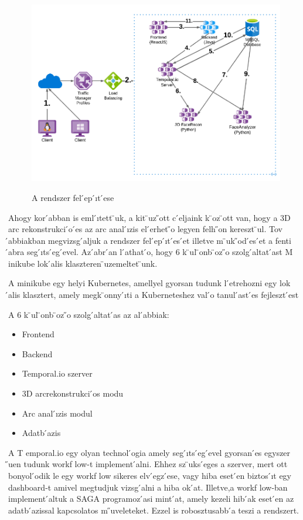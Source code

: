 \documentclass[12pt,a4]{article}
\begin{document}
	\begin{figure}[h]	
		\centering
		\includegraphics[width=1\linewidth]{sysplan}
		\label{fig:sysplan}
		\caption{ A rendszer fel ́ep ́ıt ́ese}
	\end{figure}

	Ahogy kor ́abban is eml ́ıtett ̈uk, a kit ̈uz ̋ott c ́eljaink k ̈oz ̈ott van, hogy a
	3D arc rekonstrukci ́o  ́es az arc anal ́ızis el ́erhet ̋o legyen felh ̋on kereszt ̈ul.
	Tov ́abbiakban megvizsg ́aljuk a rendszer fel ́ep ́ıt ́es ́et illetve m ̈uk ̋od ́es ́et a
	fenti  ́abra seg ́ıts ́eg ́evel. Az  ́abr ́an l ́athat ́o, hogy 6 k ̈ul ̈onb ̈oz ̋o szolg ́altat ́ast
	M inikube lok ́alis klaszteren  ̈uzemeltet ̈unk.
	
	\begin{mdframed}
		A minikube egy helyi Kubernetes, amellyel gyorsan tudunk l ́etrehozni
		egy lok ́alis klasztert, amely megk ̈onny ́ıti a Kuberneteshez val ́o tanul ́ast
		́es fejleszt ́est
	\end{mdframed}

	A 6 k ̈ul ̈onb ̈oz ̋o szolg ́altat ́as az al ́abbiak:
	\begin{itemize}
		\item Frontend
		\item Backend
		\item Temporal.io szerver
		\item 3D arcrekonstrukci ́os modu
		\item Arc anal ́ızis modul
		\item Adatb ́azis
	\end{itemize}

	A T emporal.io egy olyan technol ́ogia amely seg ́ıts ́eg ́evel gyorsan  ́es
	egyszer ̋uen tudunk workf low-t implement ́alni. Ehhez sz ̈uks ́eges a szerver,
	mert ott bonyol ́odik le egy workf low sikeres elv ́egz ́ese, vagy hiba eset ́en
	biztos ́ıt egy dashboard-t amivel megtudjuk vizsg ́alni a hiba ok ́at. Illetve,a
	workf low-ban implement ́altuk a SAGA programoz ́asi mint ́at, amely kezeli
	hib ́ak eset ́en az adatb ́azissal kapcsolatos m ̋uveleteket. Ezzel is robosztusabb ́a
	teszi a rendszert.
	
\end{document}
